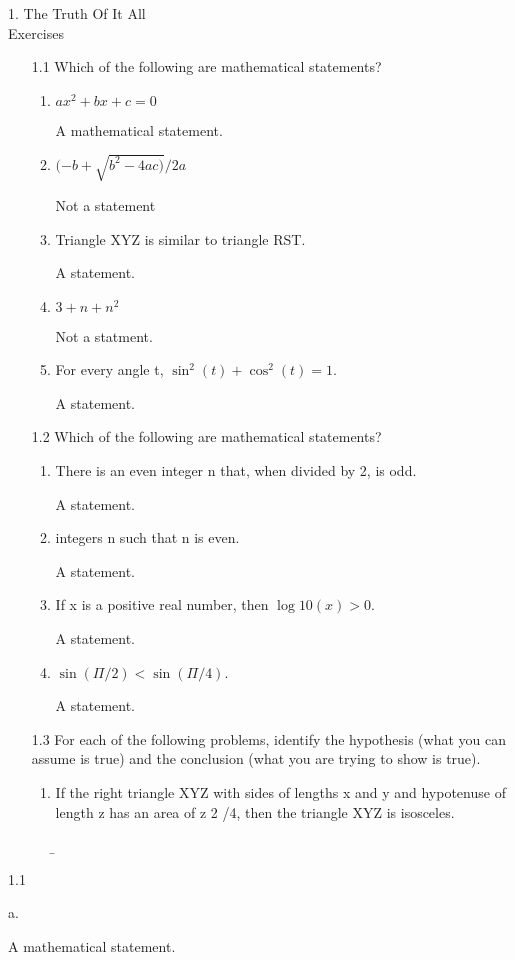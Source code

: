 \documentclass[11pt]{article}
\begin{document}
 1. The Truth Of It All\\
 Exercises
 \begin{enumerate}
   \item[1.1] Which of the following are mathematical statements?
   \begin{enumerate}
      \item $ax^2+bx+c=0$\par
      A mathematical statement.
      \item $(-b+\sqrt{b^2-4ac)}/2a$\par
      Not a statement
      \item Triangle XYZ is similar to triangle RST.\par
      A statement.
      \item $3+n+n^2$\par
      Not a statment.
      \item For every angle t, $\sin^2(t) + \cos^2(t) = 1$.\par
      A statement.
   \end{enumerate}
   \item[1.2] Which of the following are mathematical statements?
   \begin{enumerate}
     \item There is an even integer n that, when divided by 2, is odd.\par
     A statement.
     \item {integers n such that n is even}.\par
     A statement.
     \item If x is a positive real number, then $\log10 (x) > 0$.\par
     A statement.
     \item $\sin(\Pi/2) < \sin(\Pi/4)$.\par
     A statement.
   \end{enumerate}
   \item[1.3] For each of the following problems, identify the hypothesis (what you
can assume is true) and the conclusion (what you are trying to show is true).
   \begin{enumerate}
     \item If the right triangle XYZ with sides of lengths x and y and hypotenuse
of length z has an area of z 2 /4, then the triangle XYZ is isosceles.\par
   \b
   \end{enumerate}
 \end{enumerate}
 1.1 
 
 
a. 


\hspace{1em} A mathematical statement.
\end{document}
